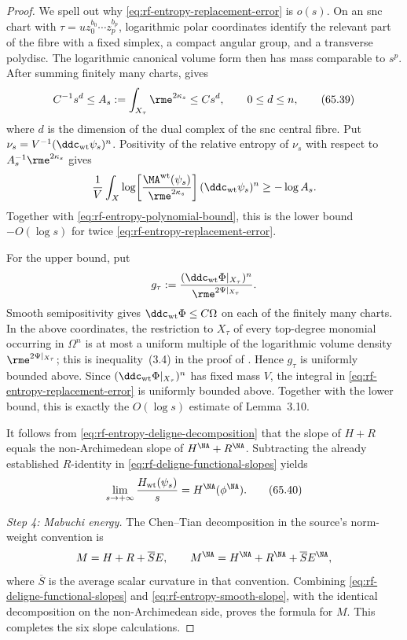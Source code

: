 \begin{proof}
We spell out why \eqref{eq:rf-entropy-replacement-error} is $o(s)$.
On an snc chart with
$\tau=u z_0^{b_0}\cdots z_p^{b_p}$, logarithmic polar coordinates identify
the relevant part of the fibre with a fixed simplex, a compact angular
group, and a transverse polydisc.  The logarithmic canonical volume form
then has mass comparable to $s^p$.  After summing finitely many charts,
\cite[Lemma~3.11]{BHJ19} gives
\[
 C^{-1}s^d\leq
       A_s:=\int_{X_\tau}\rme^{2\kappa_s}
       \leq Cs^d,
 \qquad 0\leq d\leq n,
\tag{65.39}\label{eq:rf-entropy-polynomial-bound}
\]
where $d$ is the dimension of the dual complex of the snc central
fibre.  Put $\nu_s=V^{-1}(\ddc_{\mathrm{wt}}\psi_s)^n$.  Positivity of the relative
entropy of $\nu_s$ with respect to
$A_s^{-1}\rme^{2\kappa_s}$ gives
\[
 \frac1V\int_X\log\!\left[
       \frac{\MA^{\mathrm{wt}}(\psi_s)}{\rme^{2\kappa_s}}
     \right](\ddc_{\mathrm{wt}}\psi_s)^n
 \geq -\log A_s.
\]
Together with \eqref{eq:rf-entropy-polynomial-bound}, this is the lower
bound $-O(\log s)$ for twice
\eqref{eq:rf-entropy-replacement-error}.

For the upper bound, put
\[
 g_\tau:=
 \frac{(\ddc_{\mathrm{wt}}\Phi|_{X_\tau})^n}
      {\rme^{2\Psi|_{X_\tau}}}.
\]
Smooth semipositivity gives $\ddc_{\mathrm{wt}}\Phi\leq C\Omega$ on each of the
finitely many charts.  In the above coordinates, the restriction to
$X_\tau$ of every top-degree monomial occurring in $\Omega^n$ is at
most a uniform multiple of the logarithmic volume density
$\rme^{2\Psi|_{X_\tau}}$; this is inequality~(3.4) in the proof of
\cite[Lemma~3.10]{BHJ19}.  Hence $g_\tau$ is uniformly bounded above.
Since $(\ddc_{\mathrm{wt}}\Phi|_{X_\tau})^n$ has fixed mass $V$, the integral in
\eqref{eq:rf-entropy-replacement-error} is uniformly bounded above.
Together with the lower bound, this is exactly the $O(\log s)$ estimate
of Lemma~3.10.

It follows from \eqref{eq:rf-entropy-deligne-decomposition} that the slope
of $H+R$ equals the non-Archimedean slope of $H^{\NA}+R^{\NA}$.
Subtracting the already established $R$-identity in
\eqref{eq:rf-deligne-functional-slopes} yields
\[
       \lim_{s\to+\infty}\frac{H_{\mathrm{wt}}(\psi_s)}s
          =H^{\NA}(\phi^{\NA}).
\tag{65.40}\label{eq:rf-entropy-smooth-slope}
\]

\smallskip
\noindent\emph{Step 4: Mabuchi energy.}
The Chen--Tian decomposition in the source's norm-weight convention is
\[
             M=H+R+\overline S E,
 \qquad
             M^{\NA}=H^{\NA}+R^{\NA}+\overline S E^{\NA},
\]
where $\overline S$ is the average scalar curvature in that convention.
Combining \eqref{eq:rf-deligne-functional-slopes} and
\eqref{eq:rf-entropy-smooth-slope}, with the identical decomposition on
the non-Archimedean side, proves the formula for $M$.  This completes the
six slope calculations.


\end{proof}
